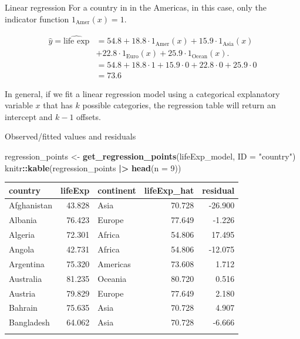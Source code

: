 \documentclass[
  ignorenonframetext,
]{beamer}
\newenvironment{Shaded}{\begin{snugshade}}{\end{snugshade}}
\newcommand{\AttributeTok}[1]{\textcolor[rgb]{0.13,0.29,0.53}{#1}}
\newcommand{\DecValTok}[1]{\textcolor[rgb]{0.00,0.00,0.81}{#1}}
\newcommand{\FunctionTok}[1]{\textcolor[rgb]{0.13,0.29,0.53}{\textbf{#1}}}
\newcommand{\NormalTok}[1]{#1}
\newcommand{\OtherTok}[1]{\textcolor[rgb]{0.56,0.35,0.01}{#1}}
\newcommand{\SpecialCharTok}[1]{\textcolor[rgb]{0.81,0.36,0.00}{\textbf{#1}}}
\newcommand{\StringTok}[1]{\textcolor[rgb]{0.31,0.60,0.02}{#1}}
\begin{document}
\begin{frame}{Linear regression}
\label{linear-regression-5}
For a country in in the Americas, in this case, only the indicator
function \(1_{\text{Amer}}(x)=1\).

\[\begin{array}{ll}
\hat{y}=\widehat{\text{life exp}}&=54.8+18.8\cdot1_{\text{Amer}}(x)+15.9\cdot 1_{\text{Asia}}(x)\\
&+22.8\cdot 1_{\text{Euro}}(x)+25.9\cdot 1_{\text{Ocean}}(x).\\
&=54.8+18.8\cdot1+15.9\cdot 0+22.8\cdot 0+25.9\cdot 0\\
&=73.6
\end{array}\]

In general, if we fit a linear regression model using a categorical
explanatory variable \(x\) that has \(k\) possible categories, the
regression table will return an intercept and \(k-1\) offsets.
\end{frame}

\begin{frame}[fragile]{Observed/fitted values and residuals}
\label{observedfitted-values-and-residuals}
\normalsize

\begin{Shaded}
\begin{Highlighting}[]
\NormalTok{regression\_points }\OtherTok{\textless{}{-}} \FunctionTok{get\_regression\_points}\NormalTok{(lifeExp\_model, }
                                           \AttributeTok{ID =} \StringTok{"country"}\NormalTok{) }
\NormalTok{knitr}\SpecialCharTok{::}\FunctionTok{kable}\NormalTok{(regression\_points }\SpecialCharTok{|\textgreater{}} \FunctionTok{head}\NormalTok{(}\AttributeTok{n =} \DecValTok{9}\NormalTok{))}
\end{Highlighting}
\end{Shaded}

\begin{longtable}[]{@{}lrlrr@{}}
\toprule\noalign{}
country & lifeExp & continent & lifeExp\_hat & residual \\
\midrule\noalign{}
\endhead
Afghanistan & 43.828 & Asia & 70.728 & -26.900 \\
Albania & 76.423 & Europe & 77.649 & -1.226 \\
Algeria & 72.301 & Africa & 54.806 & 17.495 \\
Angola & 42.731 & Africa & 54.806 & -12.075 \\
Argentina & 75.320 & Americas & 73.608 & 1.712 \\
Australia & 81.235 & Oceania & 80.720 & 0.516 \\
Austria & 79.829 & Europe & 77.649 & 2.180 \\
Bahrain & 75.635 & Asia & 70.728 & 4.907 \\
Bangladesh & 64.062 & Asia & 70.728 & -6.666 \\
\bottomrule\noalign{}
\end{longtable}

\normalsize
\end{frame}
\end{document}
